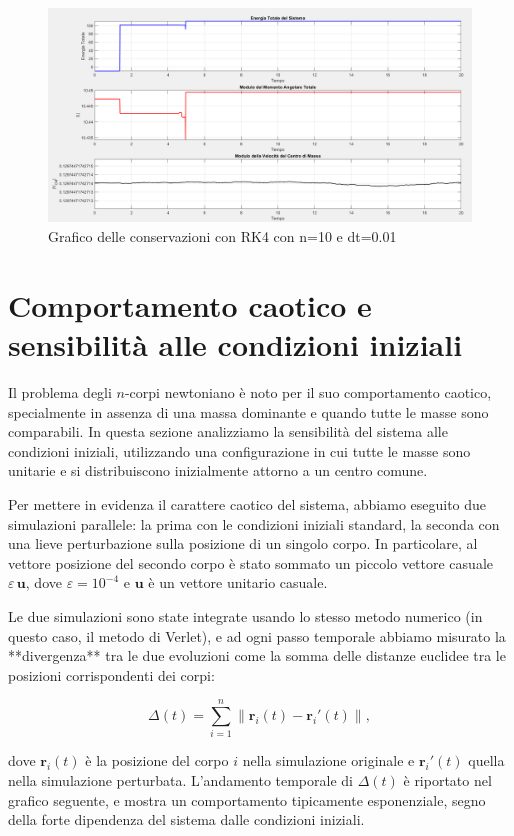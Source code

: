 \documentclass[a4paper,12pt]{article}
\begin{document}
\begin{figure}[H]
    \centering
    \includegraphics[width=1\textwidth]{rk4_conservations.png}
    \caption{Grafico delle conservazioni con RK4 con n=10 e dt=0.01}
\end{figure}

\section{Comportamento caotico e sensibilità alle condizioni iniziali}

Il problema degli \(n\)-corpi newtoniano è noto per il suo comportamento caotico, specialmente in assenza di una massa dominante e quando tutte le masse sono comparabili. In questa sezione analizziamo la sensibilità del sistema alle condizioni iniziali, utilizzando una configurazione in cui tutte le masse sono unitarie e si distribuiscono inizialmente attorno a un centro comune.

Per mettere in evidenza il carattere caotico del sistema, abbiamo eseguito due simulazioni parallele: la prima con le condizioni iniziali standard, la seconda con una lieve perturbazione sulla posizione di un singolo corpo. In particolare, al vettore posizione del secondo corpo è stato sommato un piccolo vettore casuale \(\varepsilon \, \mathbf{u}\), dove \(\varepsilon = 10^{-4}\) e \(\mathbf{u}\) è un vettore unitario casuale.

Le due simulazioni sono state integrate usando lo stesso metodo numerico (in questo caso, il metodo di Verlet), e ad ogni passo temporale abbiamo misurato la **divergenza** tra le due evoluzioni come la somma delle distanze euclidee tra le posizioni corrispondenti dei corpi:

\[
\Delta(t) = \sum_{i=1}^{n} \left\| \mathbf{r}_i(t) - \mathbf{r}_i'(t) \right\|,
\]

dove \(\mathbf{r}_i(t)\) è la posizione del corpo \(i\) nella simulazione originale e \(\mathbf{r}_i'(t)\) quella nella simulazione perturbata. L'andamento temporale di \(\Delta(t)\) è riportato nel grafico seguente, e mostra un comportamento tipicamente esponenziale, segno della forte dipendenza del sistema dalle condizioni iniziali.
\end{document}
